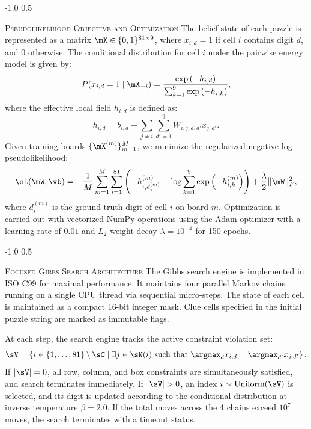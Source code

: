 \documentclass{article} %
\makeatletter
\renewcommand{\subsection}{\@startsection{subsection}{2}{\z@}%
  {-1.0\baselineskip}%
  {0.5\baselineskip}%
  {\normalfont\fontsize{10}{11}\selectfont\raggedright\scshape}}
\makeatother
\begin{document}
\subsection{\textsc{Pseudolikelihood Objective and Optimization}}
The belief state of each puzzle is represented as a matrix $\mX \in \{0, 1\}^{81 \times 9}$, where $x_{i,d} = 1$ if cell $i$ contains digit $d$, and $0$ otherwise. The conditional distribution for cell $i$ under the pairwise energy model is given by:
\begin{equation}
P(x_{i,d} = 1 \mid \mX_{-i}) = \frac{\exp\left( - h_{i,d} \right)}{\sum_{k=1}^9 \exp\left( - h_{i,k} \right)},
\end{equation}
where the effective local field $h_{i,d}$ is defined as:
\begin{equation}
h_{i,d} = b_{i,d} + \sum_{j \neq i} \sum_{d'=1}^9 W_{i,j,d,d'} x_{j,d'}.
\end{equation}
Given training boards $\{\mX^{(m)}\}_{m=1}^M$, we minimize the regularized negative log-pseudolikelihood:
\begin{equation}
\sL(\mW, \vb) = - \frac{1}{M} \sum_{m=1}^M \sum_{i=1}^{81} \left( - h_{i, d_i^{(m)}}^{(m)} - \log \sum_{k=1}^9 \exp\left( - h_{i,k}^{(m)} \right) \right) + \frac{\lambda}{2} \|\mW\|_F^2,
\end{equation}
where $d_i^{(m)}$ is the ground-truth digit of cell $i$ on board $m$. Optimization is carried out with vectorized NumPy operations using the Adam optimizer with a learning rate of $0.01$ and $L_2$ weight decay $\lambda = 10^{-4}$ for 150 epochs.

\subsection{\textsc{Focused Gibbs Search Architecture}}
The Gibbs search engine is implemented in ISO C99 for maximal performance. It maintains four parallel Markov chains running on a single CPU thread via sequential micro-steps. The state of each cell is maintained as a compact 16-bit integer mask. Clue cells specified in the initial puzzle string are marked as immutable flags.

At each step, the search engine tracks the active constraint violation set:
\begin{equation}
\sV = \left\{ i \in \{1, \dots, 81\} \setminus \sC \;\middle|\; \exists j \in \sN(i) \text{ such that } \argmax_d x_{i,d} = \argmax_{d'} x_{j,d'} \right\}.
\end{equation}
If $|\sV| = 0$, all row, column, and box constraints are simultaneously satisfied, and search terminates immediately. If $|\sV| > 0$, an index $i \sim \text{Uniform}(\sV)$ is selected, and its digit is updated according to the conditional distribution at inverse temperature $\beta = 2.0$. If the total moves across the 4 chains exceed $10^7$ moves, the search terminates with a timeout status.
\end{document}

